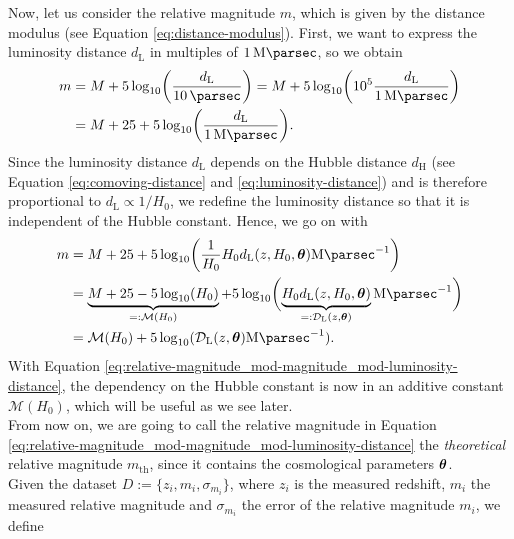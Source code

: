Now, let us consider the relative magnitude $m$, which is given by the distance modulus (see Equation \eqref{eq:distance-modulus}). First, we want to express the luminosity distance $d_{\text{L}}$ in multiples of $\SI{1}{\mega \parsec}$, so we obtain
\begin{align*}
    m &= M + 5\log_{10}\biggl( \frac{d_{\text{L}}}{\SI{10}{\parsec}} \biggr) = M + 5\log_{10}\biggl( 10^{5} \frac{d_{\text{L}}}{\SI{1}{\mega \parsec}} \biggr) \\
      &= M + 25 + 5\log_{10}\biggl(\frac{d_{\text{L}}}{\SI{1}{\mega \parsec}}\biggr). 
\end{align*}
Since the luminosity distance $d_{\text{L}}$ depends on the Hubble distance $d_{\text{H}}$ (see Equation \eqref{eq:comoving-distance} and \eqref{eq:luminosity-distance}) and is therefore proportional to $d_{\text{L}} \propto 1/H_{0}$, we redefine the luminosity distance so that it is independent of the Hubble constant. Hence, we go on with 
\begin{align}
m &= M + 25 + 5\log_{10} \biggl(\frac{1}{H_{0}} H_{0} d_{\text{L}}(z, H_{0}, \vb*{\theta}) \SI{}{\mega \parsec^{-1}} \biggr) \nonumber \\
  &= \underbrace{M + 25 - 5\log_{10}(H_{0})}_{ =: \mathcal{M}(H_{0}) } + 5 \log_{10} \biggl( \underbrace{H_{0} d_{\text{L}}(z, H_{0}, \vb*{\theta})}_{ =: \mathcal{D}_{\text{L}}(z, \vb*{\theta}) } \SI{}{\mega \parsec^{-1}} \biggr) \nonumber \\
  &= \mathcal{M}(H_{0}) + 5 \log_{10}(\mathcal{D}_{\text{L}}(z, \vb*{\theta}) \SI{}{\mega \parsec^{-1}}). \label{eq:relative-magnitude_mod-magnitude_mod-luminosity-distance}
\end{align}
With Equation \eqref{eq:relative-magnitude_mod-magnitude_mod-luminosity-distance}, the dependency on the Hubble constant is now in an additive constant $\mathcal{M}(H_{0})$, which will be useful as we see later. \\

\noindent From now on, we are going to call the relative magnitude in Equation \eqref{eq:relative-magnitude_mod-magnitude_mod-luminosity-distance} the \textit{theoretical} relative magnitude $m_{\text{th}}$, since it contains the cosmological parameters $\vb*{\theta}$. \\ 

\noindent Given the dataset $D := \{z_{i}, m_{i}, \sigma_{m_{i}} \}$, where $z_{i}$ is the measured redshift, $m_{i}$ the measured relative magnitude and $\sigma_{m_{i}}$ the error of the relative magnitude $m_{i}$, we define 

